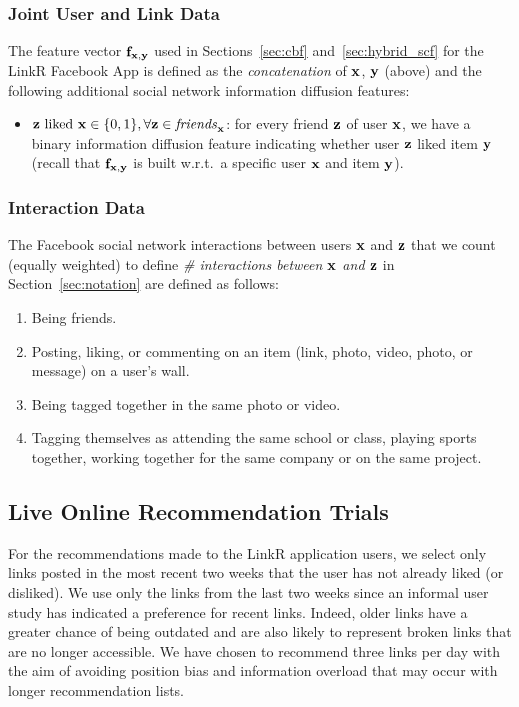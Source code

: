 \subsubsection{Joint User and Link Data}

The feature vector $\mathbf{f}_{\mathbf{x},\mathbf{y}}$ used in Sections~\ref{sec:cbf}
and~\ref{sec:hybrid_scf} for the LinkR Facebook App is defined as the
\emph{concatenation} of $\mathbf{x}$, $\mathbf{y}$ (above) and the following
additional social network information diffusion features:
\begin{itemize}
\item $\mbox{$\mathbf{z}$ liked $\mathbf{x}$} \in \{0, 1\}, \forall \mathbf{z} \in \mathit{friends}_{\mathbf{x}}$: for every friend $\mathbf{z}$ of user $\mathbf{x}$, we have a binary information diffusion  feature indicating whether user $\mathbf{z}$ liked item $\mathbf{y}$ (recall that $\mathbf{f}_{\mathbf{x},\mathbf{y}}$ is built w.r.t.\ a specific user $\mathbf{x}$ and item $\mathbf{y}$).
\end{itemize}

\subsubsection{Interaction Data}
\label{sec:interactions}

The Facebook social network interactions between users $\mathbf{x}$ and $\mathbf{z}$ that we count
(equally weighted) to define
\emph{\# interactions between $\mathbf{x}$ and $\mathbf{z}$} in Section~\ref{sec:notation} 
are defined as follows:
\begin{enumerate}
\item{Being friends.}
\item{Posting, liking, or commenting on an item (link, photo, video, photo, or message) on a user's wall.}
\item{Being tagged together in the same photo or video.}
\item{Tagging themselves as attending the same school or class, playing sports together, working together for the same company or on the same project.}
\end{enumerate}

\subsection{Live Online Recommendation Trials}

For the recommendations made to the LinkR application users, we select
only links posted in the most recent two weeks that the user has not
already liked (or disliked).  We use only the links from the last two
weeks since an informal user study has indicated a preference for
recent links.  Indeed, older links have a greater chance of being
outdated and are also likely to represent broken links that are no longer
accessible.  We have chosen to recommend three links per day
with the aim of avoiding position bias and information overload that
may occur with longer recommendation lists.

